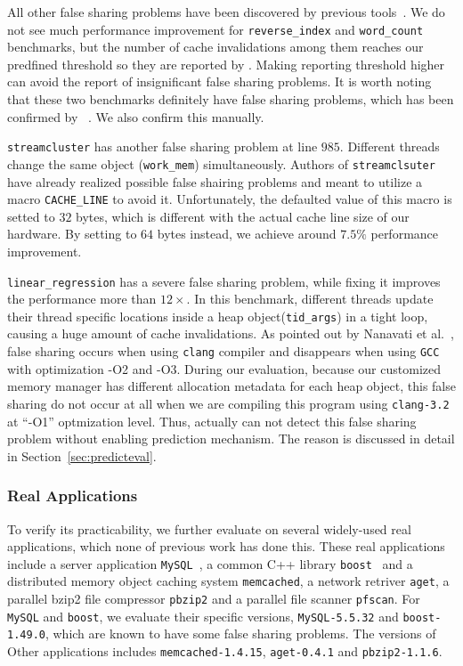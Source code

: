 All other false sharing problems have been discovered by previous tools~\cite{sheriff}.
We do not see much performance improvement for \texttt{reverse\_index} and 
\texttt{word\_count} benchmarks, but the number of cache invalidations 
among them reaches our predfined threshold so they are reported by \predator{}.
Making reporting threshold higher can avoid the report of insignificant false sharing problems.
It is worth noting that these two benchmarks definitely have false sharing problems,
which has been confirmed by \Sheriff~\cite{sheriff}. 
We also confirm this manually. 

\texttt{streamcluster} has another false sharing problem at line $985$. 
Different threads change the same object (\texttt{work\_mem}) simultaneously. 
Authors of \texttt{streamclsuter} have already realized possible
false shairing problems and meant to utilize a macro \texttt{CACHE\_LINE} to avoid it. Unfortunately,
the defaulted value of this macro is setted to $32$ bytes, which is different with the actual
cache line size of our hardware. By setting to $64$ bytes instead, we achieve around $7.5\%$ performance
improvement.

\texttt{linear\_regression} has a severe false sharing problem, 
while fixing it improves the performance more than $12\times$.
In this benchmark, different threads update their thread specific locations 
inside a heap object(\texttt{tid\_args}) in a tight loop, 
causing a huge amount of cache invalidations. 
As pointed out by Nanavati et al.~\cite{OSdetection}, false sharing 
occurs when using \texttt{clang} compiler and disappears when using \texttt{GCC} with optimization
-O2 and -O3.  
During our evaluation, because our customized memory manager has different allocation 
metadata for each heap object, this false sharing do not 
occur at all when we are compiling this program
using \texttt{clang-3.2} at ``-O1'' optmization level.
Thus, \Predator{} actually can not detect this false sharing problem without enabling 
prediction mechanism. 
The reason is discussed in detail in Section~\ref{sec:predicteval}.

\subsubsection{Real Applications}
To verify its practicability, we further evaluate \Predator{} 
on several widely-used real applications, which none of previous work has done this.  
These real applications include a server application \texttt{MySQL}~\cite{mysql}, 
a common C++ library \texttt{boost}~\cite{libfalsesharing} 
and a distributed memory object caching system \texttt{memcached}, a network retriver \texttt{aget}, 
a parallel bzip2 file compressor \texttt{pbzip2} and a parallel file scanner \texttt{pfscan}.
For \texttt{MySQL} and \texttt{boost},
we evaluate their specific versions, \texttt{MySQL-5.5.32} and
\texttt{boost-1.49.0}, which are known to have some false sharing problems.
The versions of Other applications includes \texttt{memcached-1.4.15},
\texttt{aget-0.4.1} and \texttt{pbzip2-1.1.6}.


